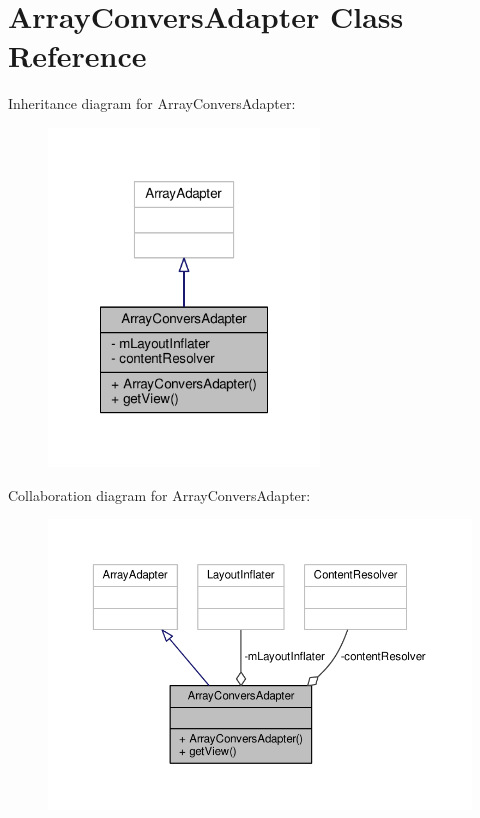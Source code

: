 \hypertarget{a00003}{\section{Array\+Convers\+Adapter Class Reference}
\label{a00003}
}


Inheritance diagram for Array\+Convers\+Adapter\+:
\nopagebreak
\begin{figure}[H]
\begin{center}
\leavevmode
\includegraphics[width=204pt]{a00061}
\end{center}
\end{figure}


Collaboration diagram for Array\+Convers\+Adapter\+:
\nopagebreak
\begin{figure}[H]
\begin{center}
\leavevmode
\includegraphics[width=350pt]{a00062}
\end{center}
\end{figure}
